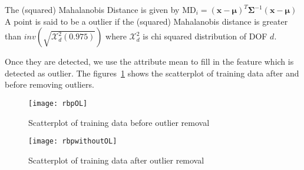 \documentclass[11pt,paper=a4,answers]{exam}
\renewcommand{\vec}[1]{\mathbf{#1}}
\begin{document}
\begin{questions}
\begin{enumerate}[i.]
        The (squared) Mahalanobis Distance is given by $\mathrm{MD}_i = (\vec{x} - \bm{\mu})^T \bm{\Sigma}^{-1}(\vec{x} - \bm{\mu})$\\
        A point is said to be a outlier if the (squared) Mahalanobis distance is greater than $inv\left(\sqrt{\mathcal{X}_d ^2 (0.975)}\right)$ where $\mathcal{X}_d ^2$ is chi squared distribution of DOF $d$.

        Once they are detected, we use the attribute mean to fill in the feature which is detected as outlier.
        The figures~\ref{scatterOL} shows the scatterplot of training data after and before removing outliers.
        \begin{figure}[htb]
              \texttt{[image: rbpOL]}
              \caption{Scatterplot of training data before outlier removal}\label{scatterOL}
            \endminipage\hfill
              \texttt{[image: rbpwithoutOL]}
              \caption{Scatterplot of training data after outlier removal}
            \endminipage\hfill
        \end{figure}


\end{enumerate}
\end{questions}
\end{document}
